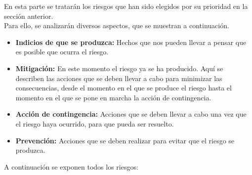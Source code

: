 \documentclass[spanish,a4paper,11pt, twoside]{report}	%
\begin{document}
	En esta parte se tratarán los riesgos que han sido elegidos por su prioridad en la sección anterior.\\
	Para ello, se analizarán diversos aspectos, que se muestran a continuación.
		\begin{itemize}
			\item \textbf {Indicios de que se produzca: }Hechos que nos pueden llevar a pensar que es posible que ocurra
							el riesgo.
			\item \textbf {Mitigación: }En este momento el riesgo ya se ha producido. Aquí se describen las acciones
							que se deben llevar a cabo para minimizar las consecuencias, desde el momento en el que
							se produce el riesgo hasta el momento en el que se pone en marcha la acción de contingencia.
			\item \textbf {Acción de contingencia: }Acciones que se deben llevar a cabo una vez que el riesgo haya
							ocurrido, para que pueda ser resuelto.
			\item \textbf {Prevención: }Acciones que se deben realizar para evitar que el riesgo se produzca.
			
		\end{itemize}
	A continuación se exponen todos los riesgos:\\ \ \\ \ \\
	\setcounter{section}{0}
\end{document}

